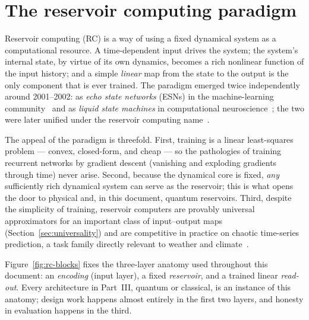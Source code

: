 
\section{The reservoir computing paradigm}
\label{sec:rc-paradigm}

Reservoir computing (RC) is a way of using a fixed dynamical system as a
computational resource. A time-dependent input drives the system; the system's
internal state, by virtue of its own dynamics, becomes a rich nonlinear
function of the input history; and a simple \emph{linear} map from the state to
the output is the only component that is ever trained. The paradigm emerged
twice independently around 2001--2002: as \emph{echo state networks} (ESNs) in
the machine-learning community~\citep{jaeger2001echo,jaeger2004harnessing} and
as \emph{liquid state machines} in computational
neuroscience~\citep{maass2002realtime}; the two were later unified under the
reservoir computing name~\citep{verstraeten2007experimental,lukosevicius2009reservoir}.

The appeal of the paradigm is threefold. First, training is a linear
least-squares problem --- convex, closed-form, and cheap --- so the pathologies of
training recurrent networks by gradient descent (vanishing and exploding
gradients through time) never arise. Second, because the dynamical core is
fixed, \emph{any} sufficiently rich dynamical system can serve as the
reservoir; this is what opens the door to physical and, in this document,
quantum reservoirs. Third, despite the simplicity of training, reservoir
computers are provably universal approximators for an important class of
input--output maps (Section~\ref{sec:universality}) and are competitive in
practice on chaotic time-series prediction, a task family directly relevant to
weather and climate~\citep{pathak2018model,arcomano2020machine,vlachas2020backpropagation}.

Figure~\ref{fig:rc-blocks} fixes the three-layer anatomy used throughout this
document: an \emph{encoding} (input layer), a fixed \emph{reservoir}, and a
trained linear \emph{read-out}. Every architecture in Part~III, quantum or
classical, is an instance of this anatomy; design work happens almost entirely
in the first two layers, and honesty in evaluation happens in the third.


